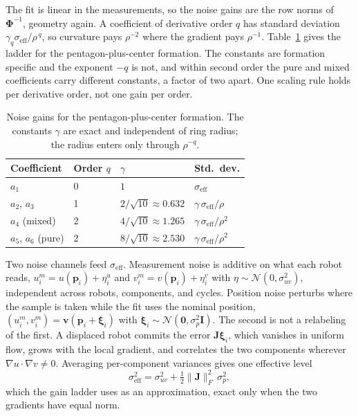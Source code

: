 \documentclass[lettersize,journal]{IEEEtran}
\begin{document}
The fit is linear in the measurements, so the noise gains are the row
norms of $\boldsymbol{\Phi}^{-1}$, geometry again. A coefficient of
derivative order $q$ has standard deviation $\gamma_q
\sigma_{\mathrm{eff}} / \rho^{\,q}$, so curvature pays $\rho^{-2}$
where the gradient pays $\rho^{-1}$. Table~\ref{tab:gain_ladder} gives
the ladder for the pentagon-plus-center formation. The constants are
formation specific and the exponent $-q$ is not, and within second
order the pure and mixed coefficients carry different constants, a
factor of two apart. One scaling rule holds per derivative order, not
one gain per order.

\begin{table}[!t]
\caption{Noise gains for the pentagon-plus-center formation. The
constants $\gamma$ are exact and independent of ring radius; the radius
enters only through $\rho^{-q}$.}
\label{tab:gain_ladder}
\centering
\begin{tabular}{llll}
\hline
Coefficient & Order $q$ & $\gamma$ & Std.\ dev. \\
\hline
$a_1$ & 0 & $1$ & $\sigma_{\mathrm{eff}}$ \\
$a_2$, $a_3$ & 1 & $2/\sqrt{10} \approx 0.632$ &
    $\gamma\,\sigma_{\mathrm{eff}}/\rho$ \\
$a_4$ (mixed) & 2 & $4/\sqrt{10} \approx 1.265$ &
    $\gamma\,\sigma_{\mathrm{eff}}/\rho^2$ \\
$a_5$, $a_6$ (pure) & 2 & $8/\sqrt{10} \approx 2.530$ &
    $\gamma\,\sigma_{\mathrm{eff}}/\rho^2$ \\
\hline
\end{tabular}
\end{table}

Two noise channels feed $\sigma_{\mathrm{eff}}$. Measurement noise is
additive on what each robot reads, $u_i^m = u(\mathbf{p}_i) + \eta_i^u$
and $v_i^m = v(\mathbf{p}_i) + \eta_i^v$ with $\eta \sim
\mathcal{N}(0, \sigma_{uv}^2)$, independent across robots, components,
and cycles. Position noise perturbs where the sample is taken while the
fit uses the nominal position, $(u_i^m, v_i^m) =
\mathbf{v}(\mathbf{p}_i + \boldsymbol{\xi}_i)$ with
$\boldsymbol{\xi}_i \sim \mathcal{N}(\mathbf{0}, \sigma_p^2\mathbf{I})$.
The second is not a relabeling of the first. A displaced robot commits
the error $\mathbf{J}\boldsymbol{\xi}_i$, which vanishes in uniform
flow, grows with the local gradient, and correlates the two components
wherever $\nabla u \cdot \nabla v \neq 0$. Averaging per-component
variances gives one effective level
\begin{equation}
    \sigma_{\mathrm{eff}}^2 = \sigma_{uv}^2
        + \tfrac{1}{2}\lVert\mathbf{J}\rVert_F^2\,\sigma_p^2 ,
    \label{eq:sigma_eff}
\end{equation}
which the gain ladder uses as an approximation, exact only when the two
gradients have equal norm.
\end{document}
